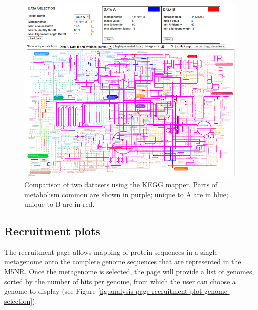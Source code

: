 \documentclass[12pt,fullpage]{report}
\begin{document}
\begin{figure}[ht]
\begin{center}
\includegraphics[width=6in]{Images/analysis-page-kegg-mapper-example.png}
\end{center}
\caption{Comparison of two datasets using the KEGG mapper. Parts of metabolism common are shown in purple; unique to A are in blue; unique to B are in red.}
\label{fig:analysis-page-kegg-mapper-example}
\end{figure}





\subsection{Recruitment plots}
\label{section:recruitment-plots}

The recruitment page allows mapping of protein sequences in a single metagenome onto the complete genome sequences that are represented in the M5NR.
Once the metagenome is selected, the page will provide a list of genomes, sorted by the number of hits per genome, from which the user can choose a genome to display (see Figure \ref{fig:analysis-page-recruitment-plot-genome-selection}).
\end{document}
